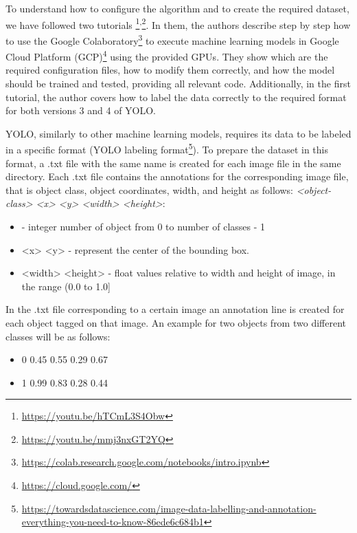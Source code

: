 To understand how to configure the algorithm and to create the required dataset, we have followed two tutorials \footnote{\href{https://youtu.be/hTCmL3S4Obw}{https://youtu.be/hTCmL3S4Obw}}\textsuperscript{,}\footnote{\href{https://youtu.be/mmj3nxGT2YQ}{https://youtu.be/mmj3nxGT2YQ}\label{second-tutorial}}. In them, the authors describe step by step how to use the Google Colaboratory\footnote{\href{https://colab.research.google.com/notebooks/intro.ipynb}{https://colab.research.google.com/notebooks/intro.ipynb}} to execute machine learning models in Google Cloud Platform (GCP)\footnote{\href{https://cloud.google.com/}{https://cloud.google.com/}} using the provided GPUs. They show which are the required configuration files, how to modify them correctly, and how the model should be trained and tested, providing all relevant code. Additionally, in the first tutorial, the author covers how to label the data correctly to the required format for both versions 3 and 4 of YOLO.

YOLO, similarly to other machine learning models, requires its data to be labeled in a specific format (YOLO labeling format\footnote{\href{https://towardsdatascience.com/image-data-labelling-and-annotation-everything-you-need-to-know-86ede6c684b1}{https://towardsdatascience.com/image-data-labelling-and-annotation-everything-you-need-to-know-86ede6c684b1}}). To prepare the dataset in this format, a .txt file with the same name is created for each image file in the same directory. Each .txt file contains the annotations for the corresponding image file, that is object class, object coordinates, width, and height as follows: \textit{<object-class> <x> <y> <width> <height>}:

\begin{itemize}
\item <object-class> - integer number of object from 0 to number of classes - 1
\item <x> <y> - represent the center of the bounding box.
\item <width> <height> - float values relative to width and height of image, in the range (0.0 to 1.0]
\end{itemize}

In the .txt file corresponding to a certain image an annotation line is created for each object tagged on that image. An example for two objects from two different classes will be as follows:
\begin{itemize}
\item 0 0.45 0.55 0.29 0.67
\item 1 0.99 0.83 0.28 0.44
\end{itemize}

